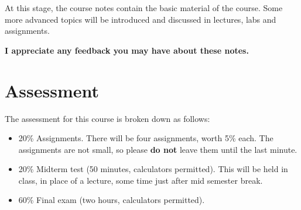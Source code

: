 At this stage, the course notes contain the basic material of the course. Some
more advanced topics will be introduced and discussed in lectures, labs and
assignments.

\begin{framed}
\begin{center}
{\bf 
I appreciate any feedback you may have about these notes.
}
\end{center}
\end{framed}

\section{Assessment}
The assessment for this course is broken down as follows:
\begin{itemize}
\item 20\% Assignments. There will be four assignments, worth 5\% each. The
assignments are not small, so please {\bf do not} leave them until the last minute.
\item 20\% Midterm test (50 minutes, calculators permitted). This will be held
in class, in place of a lecture, some time just after mid semester break.
\item 60\% Final exam (two hours, calculators permitted).
\end{itemize}

